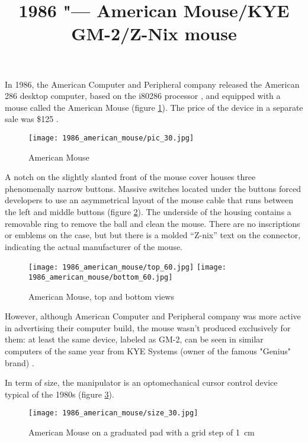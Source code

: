 \documentclass[11pt, a4paper]{article}
\begin{document}
\title{1986 "--- American Mouse/KYE GM-2/Z-Nix mouse}
\date{}
\maketitle
{}
In 1986, the American Computer and Peripheral company released the American 286 desktop computer, based on the i80286 processor \cite{adv}, and equipped with a mouse called the American Mouse (figure \ref{fig:AmericanPic}). The price of the device in a separate sale was \$125 \cite{review}.

\begin{figure}[h]
    \centering
    \texttt{[image: 1986\_american\_mouse/pic\_30.jpg]}
    \caption{American Mouse}
    \label{fig:AmericanPic}
\end{figure}

A notch on the slightly slanted front of the mouse cover houses three phenomenally narrow buttons. Massive switches located under the buttons forced developers to use an asymmetrical layout of the mouse cable that runs between the left and middle buttons (figure \ref{AmericanTopAndBottom}). The underside of the housing contains a removable ring to remove the ball and clean the mouse. There are no inscriptions or emblems on the case, but but there is a molded ``Z-nix'' text on the connector, indicating the actual manufacturer of the mouse.

\begin{figure}[h!]
    \centering
    \texttt{[image: 1986\_american\_mouse/top\_60.jpg]}
    \texttt{[image: 1986\_american\_mouse/bottom\_60.jpg]}
    \caption{American Mouse, top and bottom views}
    \label{AmericanTopAndBottom}
\end{figure}

However, although American Computer and Peripheral company was more active in advertising their computer build, the mouse wasn't produced exclusively for them: at least the same device, labeled as GM-2, can be seen in similar computers of the same year from KYE Systems (owner of the famous "Genius" brand) \cite{kye}.

In term of size, the manipulator is an optomechanical cursor control device typical of the 1980s (figure \ref{fig:AmericanSize}).

\begin{figure}[h]
    \centering
    \texttt{[image: 1986\_american\_mouse/size\_30.jpg]}
    \caption{American Mouse on a graduated pad with a grid step of 1~cm}
    \label{fig:AmericanSize}
\end{figure}
\end{document}
